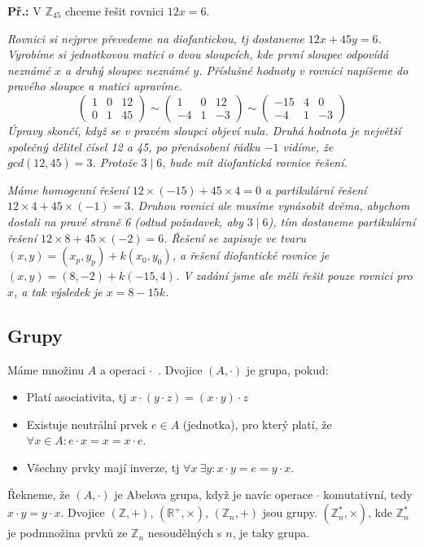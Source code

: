 \documentclass[10pt,a4paper]{article}
\begin{document}
\textbf{Př.:} V $\mathbb{Z}_{45}$ chceme řešit rovnici $12x = 6$.

\textit{Rovnici si nejprve převedeme na diofantickou, tj dostaneme $12x + 45y = 6$. Vyrobíme si jednotkovou matici o dvou sloupcích, kde první sloupec odpovídá neznámé $x$ a druhý sloupec neznámé $y$. Příslušné hodnoty v rovnici napíšeme do pravého sloupce a matici upravíme.}
\[ \left( \begin{array}{cc|c}
1 & 0 & 12\\
0 & 1 & 45
\end{array} \right)
%
\sim
%
\left( \begin{array}{cc|c}
1 & 0 & 12\\
-4 & 1 & -3
\end{array} \right)
%
\sim
%
\left( \begin{array}{cc|c}
-15 & 4 & 0\\
-4 & 1 & -3
\end{array} \right)
\]
\textit{Úpravy skončí, když se v pravém sloupci objeví nula. Druhá hodnota je největší společný dělitel čísel 12 a 45, po přenásobení řádku $-1$ vidíme, že $gcd(12,45)=3$. Protože $3 \mid 6$, bude mít diofantická rovnice řešení.}

\textit{Máme homogenní řešení $12\times(-15) + 45\times 4 = 0$ a partikulární řešení $12\times4 + 45\times(-1) = 3$. Druhou rovnici ale musíme vynásobit dvěma, abychom dostali na pravé straně 6 (odtud požadavek, aby $3\mid6$), tím dostaneme partikulární řešení $12\times8 + 45\times(-2) = 6$. Řešení se zapisuje ve tvaru $(x,y) = (x_p,y_p) + k(x_0,y_0)$, a řešení diofantické rovnice je $(x,y) = (8, -2) + k(-15,4)$. V zadání jsme ale měli řešit pouze rovnici pro $x$, a tak výsledek je $x = 8 - 15k$.}

\subsection{Grupy}
Máme množinu $A$ a operaci $\cdot$~. Dvojice $(A,\cdot)$ je grupa, pokud:
\begin{itemize}
\item Platí asociativita, tj $x\cdot(y\cdot z) = (x\cdot y)\cdot z$
\item Existuje neutrální prvek $e \in A$ (jednotka), pro který platí, že $\forall x \in A: e\cdot x = x = x \cdot e$.
\item Všechny prvky mají inverze, tj $\forall x ~\exists y: x\cdot y = e = y \cdot x$.
\end{itemize}
Řekneme, že $(A,\cdot)$ je Abelova grupa, když je navíc operace $\cdot$ komutativní, tedy $x\cdot y = y \cdot x$.
Dvojice $(\mathbb{Z}, +)$,  $(\mathbb{R}^+, \times)$,  $(\mathbb{Z}_n, +)$ jsou grupy. $(\mathbb{Z}_n^*, \times)$, kde $\mathbb{Z}_n^*$ je podmnožina prvků ze $\mathbb{Z}_n$ nesoudělných s $n$, je taky grupa.
\end{document}
